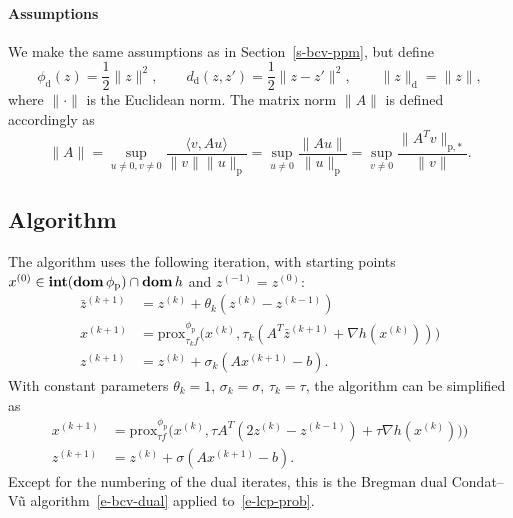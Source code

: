 \documentclass[letterpaper,11pt]{article}
\newcommand{\prox}{\mathrm{prox}}
\newcommand{\dom}{\mathop{\bf dom}}
\newcommand{\intr}{\mathop{\bf int}}
\newcommand{\inprod}[2]{\langle#1, #2\rangle}
\newcommand{\primal}{\mathrm p}
\newcommand{\dual}{\mathrm d}
\begin{document}
\paragraph{Assumptions}
We make the same assumptions as in Section~\ref{s-bcv-ppm}, but define
\[
\phi_\dual (z) = \frac{1}{2} \|z\|^2, \qquad
d_\dual (z,z') = \frac{1}{2} \|z-z'\|^2, \qquad
\|z\|_\dual = \|z\|,
\]
where $\|\cdot\|$ is the Euclidean norm.
The matrix norm $\|A\|$ is defined accordingly as
\[
\|A\|=\sup_{u \neq 0, v \neq 0}
  \frac{\inprod{v}{Au}}{\|v\| \|u\|_\primal}
= \sup_{u \neq 0} \frac{\|Au\|}{\|u\|_\primal}
= \sup_{v \neq 0} \frac{\|A^Tv\|_{\primal,*}}{\|v\|}.
\]

\subsection{Algorithm} \label{s-ls-algo}

The algorithm uses the following iteration,
with starting points $x^{(0)} \in \intr(\dom \phi_\primal) \cap \dom h$
and $z^{(-1)} = z^{(0)}$:
\begin{subequations} \label{e-ls}
\begin{align}
\bar z^{(k+1)} &= z^{(k)} + \theta_k (z^{(k)} - z^{(k-1)}) 
  \label{e-ls-a} \\
x^{(k+1)} &= \prox_{\tau_k f}^{\phi_\primal} \big(
  x^{(k)}, \tau_k (A^T\bar z^{(k+1)}+\nabla h(x^{(k)}))
  \big) \label{e-ls-b} \\
z^{(k+1)} &= z^{(k)} + \sigma_k (Ax^{(k+1)}-b). \label{e-ls-c}
\end{align}
\end{subequations}
With constant parameters $\theta_k=1$, $\sigma_k=\sigma$, $\tau_k = \tau$,
the algorithm can be simplified as
\begin{align*}
x^{(k+1)} &= \prox_{\tau f}^{\phi_\primal} 
  \big( x^{(k)}, \tau A^T(2z^{(k)}-z^{(k-1)})+\tau \nabla h(x^{(k)})) 
  \big) \\
z^{(k+1)} &= z^{(k)} + \sigma (Ax^{(k+1)}-b). 
\end{align*}
Except for the numbering of the dual iterates, this is the
Bregman dual Condat--V\~u algorithm~\eqref{e-bcv-dual} 
applied to~\eqref{e-lcp-prob}.
\end{document}
